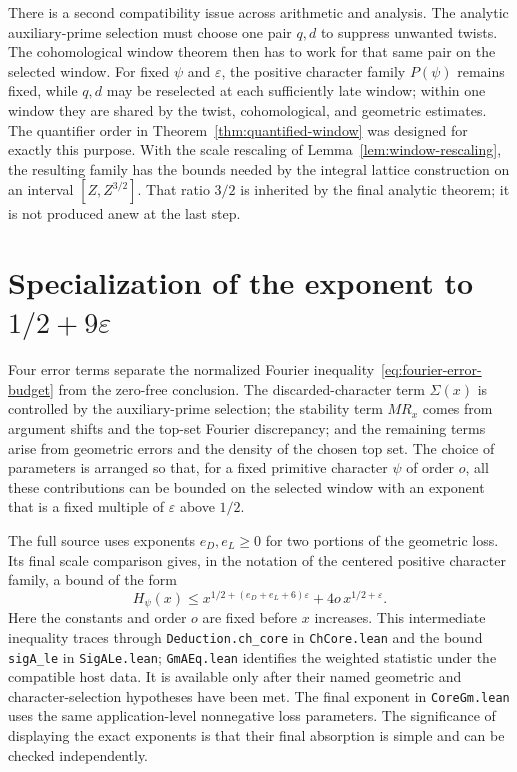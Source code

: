 \documentclass[11pt,openany,oneside]{scrbook}
\theoremstyle{definition}
\theoremstyle{remark}
\newcommand{\eps}{\varepsilon}
\begin{document}
There is a second compatibility issue across arithmetic and analysis.  The analytic auxiliary-prime selection must choose one pair $q,d$ to suppress unwanted twists.  The cohomological window theorem then has to work for that same pair on the selected window. For fixed $\psi$ and $\eps$, the positive character family $P(\psi)$ remains fixed, while $q,d$ may be reselected at each sufficiently late window; within one window they are shared by the twist, cohomological, and geometric estimates.  The quantifier order in Theorem~\ref{thm:quantified-window} was designed for exactly this purpose.  With the scale rescaling of Lemma~\ref{lem:window-rescaling}, the resulting family has the bounds needed by the integral lattice construction on an interval $[Z,Z^{3/2}]$.  That ratio $3/2$ is inherited by the final analytic theorem; it is not produced anew at the last step.

\section{Specialization of the exponent to \texorpdfstring{$1/2+9\eps$}{1/2+9 epsilon}}\label{sec:final-numerical}

Four error terms separate the normalized Fourier inequality~\eqref{eq:fourier-error-budget} from the zero-free conclusion.  The discarded-character term $\Sigma(x)$ is controlled by the auxiliary-prime selection; the stability term $MR_x$ comes from argument shifts and the top-set Fourier discrepancy; and the remaining terms arise from geometric errors and the density of the chosen top set.  The choice of parameters is arranged so that, for a fixed primitive character $\psi$ of order $o$, all these contributions can be bounded on the selected window with an exponent that is a fixed multiple of $\eps$ above $1/2$.

The full source uses exponents $e_D,e_L\ge0$ for two portions of the geometric loss.  Its final scale comparison gives, in the notation of the centered positive character family, a bound of the form
\begin{equation}\label{eq:final-one-scale}
H_\psi(x)\le x^{1/2+(e_D+e_L+6)\eps}+4o\,x^{1/2+\eps}.
\end{equation}
Here the constants and order $o$ are fixed before $x$ increases. This intermediate inequality traces through \texttt{Deduction.ch\_core} in \texttt{ChCore.lean} and the bound \texttt{sigA\_le} in \texttt{SigALe.lean}; \texttt{GmAEq.lean} identifies the weighted statistic under the compatible host data. It is available only after their named geometric and character-selection hypotheses have been met. The final exponent in \texttt{CoreGm.lean} uses the same application-level nonnegative loss parameters. The significance of displaying the exact exponents is that their final absorption is simple and can be checked independently.
\end{document}
